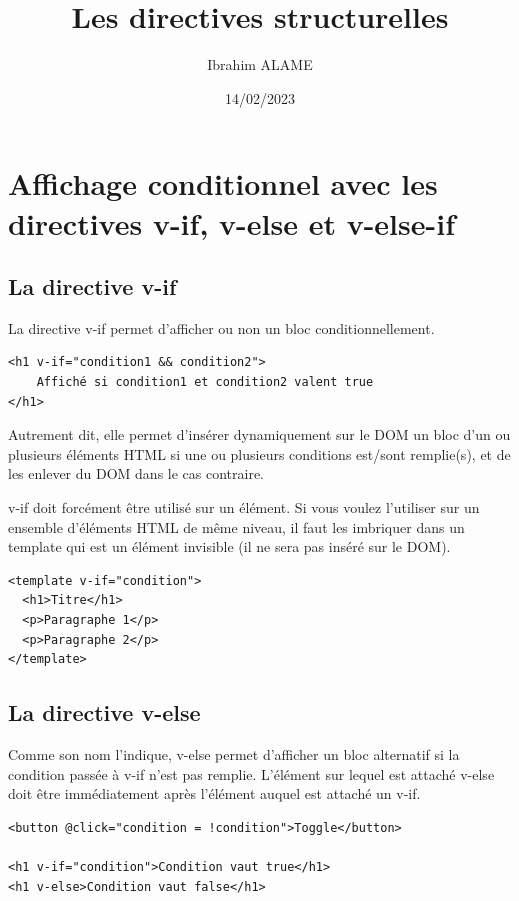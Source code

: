 \documentclass{article}
\title{Les directives structurelles}
\author{Ibrahim ALAME}
\date{14/02/2023}
\begin{document}
\maketitle

\section{Affichage conditionnel avec les directives v-if, v-else et v-else-if}
\subsection{La directive {\color{monOrange}v-if}}
La directive {\color{monOrange}v-if} permet d'afficher ou non un bloc conditionnellement.
\begin{verbatim}
<h1 v-if="condition1 && condition2">
	Affiché si condition1 et condition2 valent true
</h1>
\end{verbatim}
Autrement dit, elle permet d'insérer dynamiquement sur le DOM un bloc d'un ou plusieurs éléments HTML si une ou plusieurs conditions est/sont remplie(s), et de les enlever du DOM dans le cas contraire.

{\color{monOrange}v-if} doit forcément être utilisé sur un élément. Si vous voulez l'utiliser sur un ensemble d'éléments HTML de même niveau, il faut les imbriquer dans un template qui est un élément invisible (il ne sera pas inséré sur le DOM).
\begin{verbatim}
<template v-if="condition">
  <h1>Titre</h1>
  <p>Paragraphe 1</p>
  <p>Paragraphe 2</p>
</template>
\end{verbatim}

\subsection{La directive {\color{monOrange}v-else}}
Comme son nom l'indique, {\color{monOrange}v-else} permet d'afficher un bloc alternatif si la condition passée à {\color{monOrange}v-if} n'est pas remplie. L'élément sur lequel est attaché {\color{monOrange}v-else} doit être immédiatement après l'élément auquel est attaché un {\color{monOrange}v-if}.
\begin{verbatim}
<button @click="condition = !condition">Toggle</button>

<h1 v-if="condition">Condition vaut true</h1>
<h1 v-else>Condition vaut false</h1>
\end{verbatim}
\end{document}
